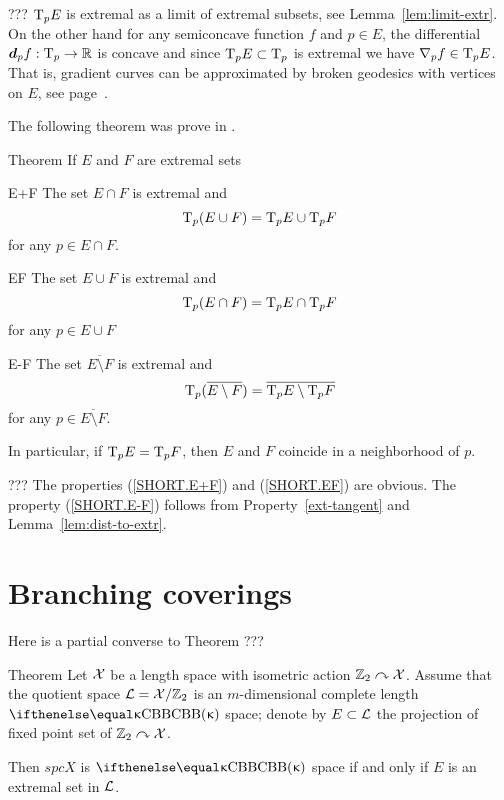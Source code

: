 ???
$\text{\rm T}_p E$ is extremal as a limit of extremal subsets, see
Lemma~\ref{lem:limit-extr}. 
On the other hand for any semiconcave function $f$ and $p\in E$, the differential $\dd_p f:\T_p\to\RR$ is concave and since $\T_p E\subset \T_p$ is extremal we have $\nabla_p f\in \T_p E$. 
That is, gradient curves can be approximated by broken
geodesics with vertices on $E$, see page~\pageref{grad-constr}.
\qeds

The following theorem was prove in \cite[3.4--5]{perelman-petrunin:extremal}.

\begin{thm}{Theorem} 
If $E$ and $F$ are extremal sets 
\begin{subthm}{E+F} The set $E\cap F$ is extremal 
and 
\[\T_p(E\cup F)=\T_p E\cup \T_p F\]
for any $p\in E\cap F$.
\end{subthm}

\begin{subthm}{EF} The set $E\cup F$  is extremal
and 
\[\T_p(E\cap F)=\T_p E\cap \T_p F\]
for any $p\in E\cup F$
\end{subthm}

\begin{subthm}{E-F} The set $\overline{E\setminus F}$ is extremal 
and 
\[\text{\rm T}_p(\overline{E\setminus
F})=\overline{\text{\rm T}_p E\setminus \text{\rm T}_p F}\]
for any $p\in \overline{E\setminus F}$.
\end{subthm}

In particular, if $\text{\rm T}_p E=\text{\rm T}_p F$, then $E$ and $F$ coincide in a neighborhood of $p$.
\end{thm}

???
 The properties (\ref{SHORT.E+F}) and (\ref{SHORT.EF}) are obvious. 
The property (\ref{SHORT.E-F}) follows from
Property~\ref{ext-tangent} and Lemma~\ref{lem:dist-to-extr}.
\qeds

\section{Branching coverings}

Here is a partial converse to Theorem ???

\begin{thm}{Theorem}
Let $\mathcal{X}$ be a length space with isometric action $\mathbb{Z}_2\curvearrowright\mathcal{X}$.
Assume that the quotient space $\mathcal{L}=\mathcal{X}/\mathbb{Z}_2$
 is an $m$-dimensional complete length $\Alex\kappa$ space; denote by $E\subset \spc{L}$ the projection of fixed point set of $\mathbb{Z}_2\curvearrowright\mathcal{X}$.

Then $spc{X}$ is $\Alex\kappa$ space if and only if $E$ is an extremal set in $\mathcal{L}$.
\end{thm}



